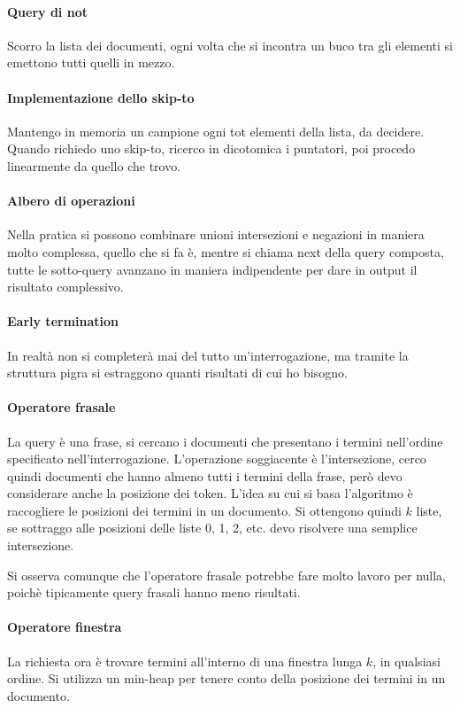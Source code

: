 \paragraph{Query di not}
Scorro la lista dei documenti, ogni volta che si incontra un buco tra gli 
elementi si emettono tutti quelli in mezzo.

\paragraph{Implementazione dello skip-to}
Mantengo in memoria un campione ogni tot elementi della lista, da decidere. 
Quando richiedo uno skip-to, ricerco in dicotomica i puntatori, poi procedo 
linearmente da quello che trovo.

\paragraph{Albero di operazioni}
Nella pratica si possono combinare unioni intersezioni e negazioni in maniera molto 
complessa, quello che si fa è, mentre si chiama next della query composta, 
tutte le sotto-query avanzano in maniera indipendente per dare in output il 
risultato complessivo.

\paragraph{Early termination}
In realtà non si completerà mai del tutto un'interrogazione, ma tramite la struttura
pigra si estraggono quanti risultati di cui ho bisogno.

\paragraph{Operatore frasale}
La query è una frase, si cercano i documenti che presentano i termini nell'ordine specificato nell'interrogazione.
L'operazione soggiacente è l'intersezione, cerco quindi documenti che hanno 
almeno tutti i termini della frase, però devo considerare anche 
la posizione dei token.
L'idea su cui si basa l'algoritmo è raccogliere le posizioni dei termini 
in un documento. 
Si ottengono quindi $k$ liste, se sottraggo alle posizioni delle liste 0, 1, 2, etc. devo risolvere una semplice intersezione. 

Si osserva comunque che l'operatore frasale potrebbe fare molto lavoro
per nulla, poichè tipicamente query frasali hanno meno risultati.

\paragraph{Operatore finestra}
La richiesta ora è trovare termini all'interno di una finestra lunga $k$, 
in qualsiasi ordine.
Si utilizza un min-heap per tenere conto della posizione dei termini 
in un documento. 


